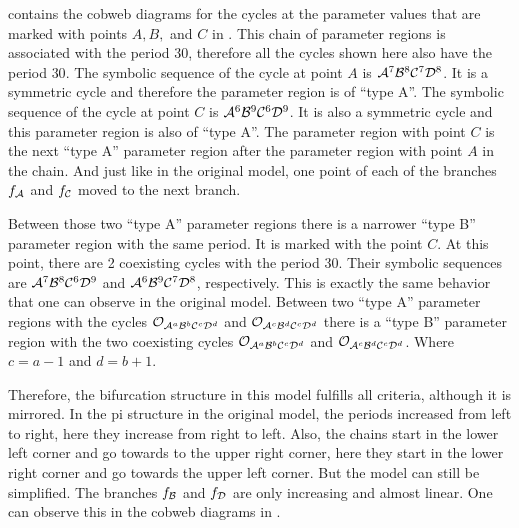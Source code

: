  contains the cobweb diagrams for the cycles at the parameter values that are marked with points $A, B,$ and $C$ in .
This chain of parameter regions is associated with the period $30$, therefore all the cycles shown here also have the period $30$.
The symbolic sequence of the cycle at point $A$ is $\mathcal{A}^7\mathcal{B}^8\mathcal{C}^7\mathcal{D}^8$.
It is a symmetric cycle and therefore the parameter region is of ``type A''.
The symbolic sequence of the cycle at point $C$ is $\mathcal{A}^6\mathcal{B}^9\mathcal{C}^6\mathcal{D}^9$.
It is also a symmetric cycle and this parameter region is also of ``type A''.
The parameter region with point $C$ is the next ``type A'' parameter region after the parameter region with point $A$ in the chain.
And just like in the original model, one point of each of the branches $f_{\mathcal{A}}$ and $f_{\mathcal{C}}$ moved to the next branch.

Between those two ``type A'' parameter regions there is a narrower ``type B'' parameter region with the same period.
It is marked with the point $C$.
At this point, there are 2 coexisting cycles with the period 30.
Their symbolic sequences are $\mathcal{A}^7\mathcal{B}^8\mathcal{C}^6\mathcal{D}^9$ and $\mathcal{A}^6\mathcal{B}^9\mathcal{C}^7\mathcal{D}^8$, respectively.
This is exactly the same behavior that one can observe in the original model.
Between two ``type A'' parameter regions with the cycles $\mathcal{O}_{\mathcal{A}^a\mathcal{B}^b\mathcal{C}^c\mathcal{D}^d}$ and $\mathcal{O}_{\mathcal{A}^c\mathcal{B}^d\mathcal{C}^c\mathcal{D}^d}$ there is a ``type B'' parameter region with the two coexisting cycles $\mathcal{O}_{\mathcal{A}^a\mathcal{B}^b\mathcal{C}^c\mathcal{D}^d}$ and $\mathcal{O}_{\mathcal{A}^c\mathcal{B}^d\mathcal{C}^c\mathcal{D}^d}$.
Where $c = a - 1$ and $d = b + 1$.

Therefore, the bifurcation structure in this model fulfills all criteria, although it is mirrored.
In the \gls{pi} structure in the original model, the periods increased from left to right, here they increase from right to left.
Also, the chains start in the lower left corner and go towards to the upper right corner, here they start in the lower right corner and go towards the upper left corner.
But the model can still be simplified.
The branches $f_{\mathcal{B}}$ and $f_{\mathcal{D}}$ are only increasing and almost linear.
One can observe this in the cobweb diagrams in .
